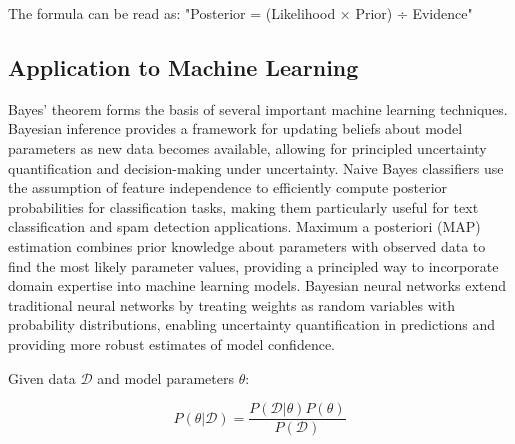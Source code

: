 The formula can be read as: "Posterior = (Likelihood × Prior) ÷ Evidence"

\subsection{Application to Machine Learning}

Bayes' theorem forms the basis of several important machine learning techniques. Bayesian inference provides a framework for updating beliefs about model parameters as new data becomes available, allowing for principled uncertainty quantification and decision-making under uncertainty. Naive Bayes classifiers use the assumption of feature independence to efficiently compute posterior probabilities for classification tasks, making them particularly useful for text classification and spam detection applications. Maximum a posteriori (MAP) estimation combines prior knowledge about parameters with observed data to find the most likely parameter values, providing a principled way to incorporate domain expertise into machine learning models. Bayesian neural networks extend traditional neural networks by treating weights as random variables with probability distributions, enabling uncertainty quantification in predictions and providing more robust estimates of model confidence.

Given data $\mathcal{D}$ and model parameters $\theta$:

\begin{equation}
P(\theta|\mathcal{D}) = \frac{P(\mathcal{D}|\theta)P(\theta)}{P(\mathcal{D})}
\end{equation}
